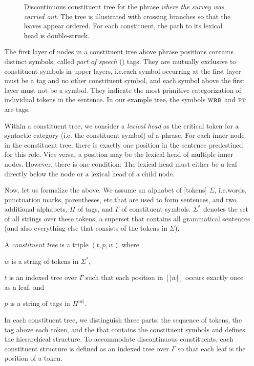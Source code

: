 \documentclass[../document.tex]{subfiles}
\begin{document}
    \begin{figure}
        \null\hfill
        
        \hfill\null

        \caption{\label{fig:pre:ctree}
            Discontinuous constituent tree for the phrase \emph{where the survey was carried out}.
            The tree is illustrated with crossing branches so that the leaves appear ordered.
            For each constituent, the path to its lexical head is double-struck.
        }
    \end{figure}

    The first layer of nodes in a constituent tree above phrase positions contains distinct symbols, called \emph{part of speech} () tags.
    They are mutually exclusive to constituent symbols in upper layers, i.e.\@ each symbol occurring at the first layer must be a  tag and no other constituent symbol, and each symbol above the first layer must not be a  symbol.
    They indicate the most primitive categorization of individual tokens in the sentence.
    In our example tree, the symbols \(\textsc{wrb}\) and \(\textsc{pt}\) are  tags.

    Within a constituent tree, we consider a \emph{lexical head} as the critical token for a syntactic category (i.e. the constituent symbol) of a phrase.
    For each inner node in the constituent tree, there is exactly one position in the sentence predestined for this role.
    Vice versa, a position may be the lexical head of multiple inner nodes.
    However, there is one condition: The lexical head must either be a leaf directly below the node or a lexical head of a child node.

    Now, let us formalize the above.
    We assume an alphabet of [tokens] \(\Sigma\), i.e.\@ words, punctuation marks, parentheses, etc.\@ that are used to form sentences, and two additional alphabets, \(\varPi\) of  tags, and \(\varGamma\) of constituent symbols.
    \(\Sigma^*\) denotes the set of all strings over these tokens, a superset that contains all grammatical sentences (and also everything else that consists of the tokens in \(\Sigma\)).

    A \emph{constituent tree} is a triple \((t, p, w)\) where
    \begin{compactitem}
        \item \(w\) is a string of tokens in \(\varSigma^*\),
        \item \(t\) is an indexed tree over \(\varGamma\) such that each position in \([|w|]\) occurs exactly once as a leaf, and
        \item \(p\) is a string of  tags in \(\varPi^{|w|}\).
    \end{compactitem}
    In each constituent tree, we distinguish three parts: the sequence of tokens, the  tag above each token, and the  that contains the constituent symbols and defines the hierarchical structure.
    To accommodate discontinuous constituents, each constituent structure is defined as an indexed tree over \(\varGamma\) so that each leaf is the position of a token.
\end{document}
